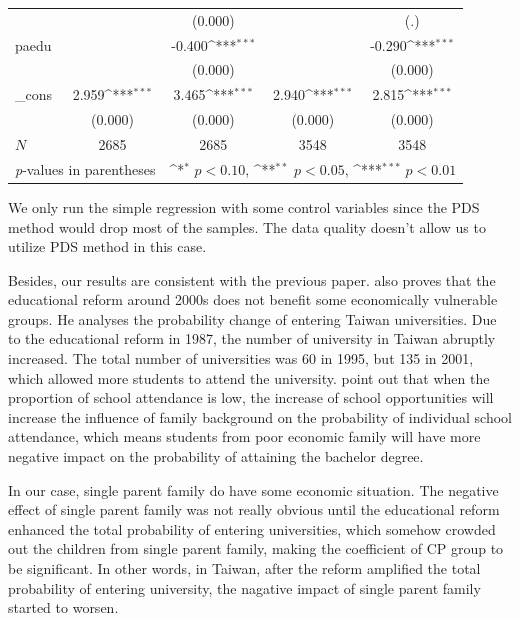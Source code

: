 \documentclass[]{AEA}
\def\sym#1{\ifmmode^{#1}\else\(^{#1}\)\fi}
\begin{document}
\begin{center}
\begin{table}
\begin{tabular}{l*{4}c}
                    &                     &     (0.000)         &                     &         (.)         \\
        [1em]
        paedu       &                     &      -0.400\sym{***}&                     &      -0.290\sym{***}\\
                    &                     &     (0.000)         &                     &     (0.000)         \\
        [1em]
        \_cons      &       2.959\sym{***}&       3.465\sym{***}&       2.940\sym{***}&       2.815\sym{***}\\
                    &     (0.000)         &     (0.000)         &     (0.000)         &     (0.000)         \\
        \hline
        \(N\)       &        2685         &        2685         &        3548         &        3548         \\
        \hline\hline
        \multicolumn{2}{l}{\footnotesize \textit{p}-values in parentheses} & \multicolumn{3}{r}{\footnotesize \sym{*} \(p<0.10\), \sym{**} \(p<0.05\), \sym{***} \(p<0.01\)}\\
        \end{tabular}
        \begin{tablenotes}
            We only run the simple regression with some control variables since the PDS method would drop most of the samples. The data quality doesn't allow us to utilize PDS method in this case.
        \end{tablenotes}
        \end{table}
        \end{center}
    Besides, our results are consistent with the previous paper.  \cite{Luoh2004}  also proves that the educational reform around 2000s does not benefit some economically vulnerable groups. He analyses the probability change of entering Taiwan universities. Due to the educational reform in 1987, the number of university in Taiwan abruptly increased. The total number of universities was 60 in 1995, but 135 in 2001, which allowed more students to attend the university.  \cite{Luoh2004} point out that when the proportion of school attendance is low, the increase of school opportunities will increase the influence of family background on the probability of individual school attendance, which means students from poor economic family will have more negative impact on the probability of attaining the bachelor degree. 
   
    In our case, single parent family do have some economic situation. The negative effect of single parent family was not really obvious until the educational reform enhanced the total probability of entering universities, which somehow crowded out the children from single parent family, making the coefficient of CP group to be significant. In other words, in Taiwan, after the reform amplified the total probability of entering university, the nagative impact of single parent family started to worsen.
\end{document}
